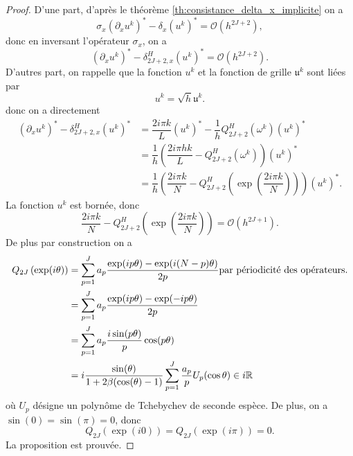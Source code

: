 \begin{proof}
D'une part, d'après le théorème \ref{th:consistance_delta_x_implicite} on a
\begin{equation}
\sigma_x (\partial_x u^k)^* - \delta_{x}(u^k)^* = \mathcal{O}(h^{2J+2}),
\end{equation}
donc en inversant l'opérateur $\sigma_x$, on a
\begin{equation}
(\partial_x u^k)^* - \delta_{2J+2,x}^H(u^k)^* = \mathcal{O}(h^{2J+2}).
\end{equation}
D'autres part, on rappelle que la fonction $u^k$ et la fonction de grille $\mathfrak{u}^k$ sont liées par
\begin{equation}
u^k = \sqrt{h} \mathfrak{u}^k.
\end{equation}
donc on a directement 
\begin{align*}
(\partial_x u^k)^* - \delta_{2J+2,x}^H (u^k)^* & = \dfrac{2 i \pi k}{L}(u^k)^* - \dfrac{1}{h}Q_{2J+2}^H(\omega^k) (u^k)^* \\
	& = \dfrac{1}{h} \left( \dfrac{2 i \pi h k}{L} - Q_{2J+2}^H(\omega^k) \right) (u^k)^*\\
	& = \dfrac{1}{h} \left( \dfrac{2 i \pi k}{N} - Q_{2J+2}^H \left( \exp \left( \dfrac{2 i \pi k}{N} \right) \right) \right) (u^k)^* .
\end{align*}
La fonction $u^k$ est bornée, donc
\begin{equation}
\dfrac{2 i \pi k}{N} - Q_{2J+2}^H \left( \exp \left( \dfrac{2 i \pi k}{N} \right) \right) = \mathcal{O}(h^{2J+1}).
\end{equation}
De plus par construction on a
\begin{align*}
Q_{2J} \left( \exp ( i \theta ) \right) & = \displaystyle\sum\limits_{p=1}^J a_p \dfrac{\exp ( i p \theta ) - \exp ( i (N-p) \theta )}{2 p} \text{par périodicité des opérateurs.} \\
	& = \displaystyle\sum\limits_{p=1}^J a_p \dfrac{\exp ( i p \theta ) - \exp ( -i p \theta )}{2 p} \\
	& = \displaystyle\sum\limits_{p=1}^J a_p \dfrac{i \sin (p \theta )}{p} \cos ( p \theta)\\
	& = i \dfrac{\sin(\theta)}{1 +2 \beta (\cos (\theta) -1)} \displaystyle\sum\limits_{p=1}^J \dfrac{a_p}{p} U_p (\cos \theta) \in i \mathbb{R}
\end{align*}
où $U_p$ désigne un polynôme de Tchebychev de seconde espèce.
De plus, on a $\sin (0 ) = \sin (\pi) = 0$, donc 
\begin{equation}
Q_{2J} \left( \exp ( i 0 ) \right) = Q_{2J} \left( \exp ( i \pi ) \right) = 0.
\end{equation}
La proposition est prouvée.
\end{proof}

